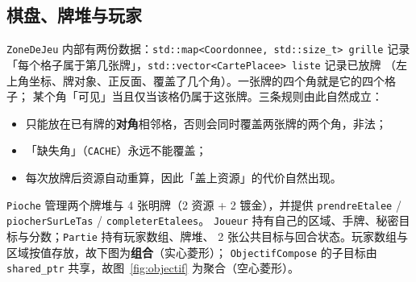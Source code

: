 \documentclass[11pt,a4paper]{ctexart}
\newcommand{\cl}[1]{\texttt{#1}}
\begin{document}
\subsection{棋盘、牌堆与玩家}
\cl{ZoneDeJeu} 内部有两份数据：\cl{std::map<Coordonnee, std::size\_t> grille}
记录「每个格子属于第几张牌」，\cl{std::vector<CartePlacee> liste} 记录已放牌
（左上角坐标、牌对象、正反面、覆盖了几个角）。一张牌的四个角就是它的四个格子；
某个角「可见」当且仅当该格仍属于这张牌。三条规则由此自然成立：
\begin{itemize}
\item 只能放在已有牌的\textbf{对角}相邻格，否则会同时覆盖两张牌的两个角，非法；
\item 「缺失角」（\cl{CACHE}）永远不能覆盖；
\item 每次放牌后资源自动重算，因此「盖上资源」的代价自然出现。
\end{itemize}
\cl{Pioche} 管理两个牌堆与 4 张明牌（2 资源 + 2 镀金），并提供
\cl{prendreEtalee} / \cl{piocherSurLeTas} / \cl{completerEtalees}。
\cl{Joueur} 持有自己的区域、手牌、秘密目标与分数；\cl{Partie} 持有玩家数组、牌堆、
2 张公共目标与回合状态。玩家数组与区域按值存放，故下图为\textbf{组合}（实心菱形）；
\cl{ObjectifCompose} 的子目标由 \cl{shared\_ptr} 共享，故图~\ref{fig:objectif} 为聚合（空心菱形）。
\end{document}
